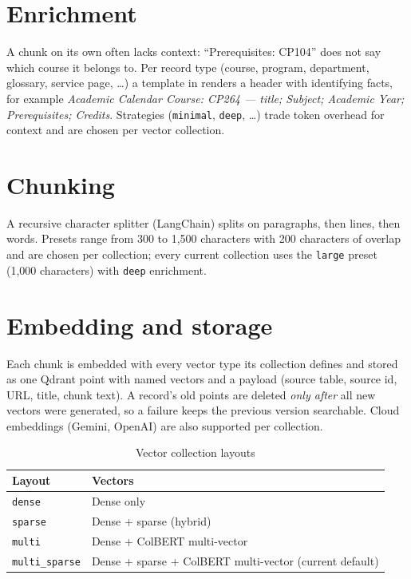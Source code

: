 \documentclass[11pt,letterpaper]{report}
\begin{document}
\section{Enrichment}
A chunk on its own often lacks context: ``Prerequisites: CP104'' does not say which course it belongs
to. Per record type (course, program, department, glossary, service page, \ldots) a template in
 renders a header with identifying facts,
for example \emph{Academic Calendar Course: CP264 --- title; Subject; Academic Year; Prerequisites;
Credits}. Strategies (\texttt{minimal}, \texttt{deep}, \ldots) trade token overhead for context and are
chosen per vector collection.

\section{Chunking}
A recursive character splitter (LangChain) splits on paragraphs, then lines, then words. Presets range
from 300 to 1{,}500 characters with 200 characters of overlap and are chosen per collection; every
current collection uses the \texttt{large} preset (1{,}000 characters) with \texttt{deep} enrichment.

\section{Embedding and storage}
Each chunk is embedded with every vector type its collection defines and stored as one Qdrant point
with named vectors and a payload (source table, source id, URL, title, chunk text). A record's old
points are deleted \emph{only after} all new vectors were generated, so a failure keeps the previous
version searchable. Cloud embeddings (Gemini, OpenAI) are also supported per collection.

\begin{table}[H]
\centering
\caption{Vector collection layouts}\label{tab:collections}
\begin{tabularx}{\textwidth}{@{}P{2.6cm}L@{}}
\toprule
\textbf{Layout} & \textbf{Vectors} \\
\midrule
\texttt{dense} & Dense only \\
\texttt{sparse} & Dense + sparse (hybrid) \\
\texttt{multi} & Dense + ColBERT multi-vector \\
\texttt{multi\_sparse} & Dense + sparse + ColBERT multi-vector (current default) \\
\bottomrule
\end{tabularx}
\end{table}
\end{document}
